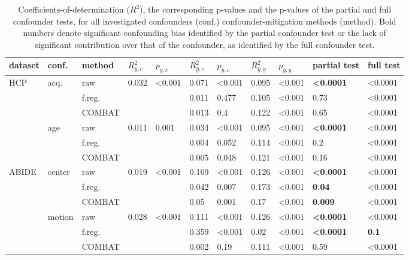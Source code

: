 \documentclass{article}
\begin{document}
\renewcommand{\arraystretch}{1.2}
\begin{table}
\centering
\begin{tabular}{lll|ll|ll|ll|ll} 
dataset & conf. & method & $R^2_{y, c}$ & $p_{y, c}$ & $R^2_{\hat{y}, c}$ & $p_{\hat{y}, c}$ & $R^2_{\hat{y}, y}$ & $p_{\hat{y}, y}$ & partial test & full test  \\
\hline
HCP & acq.  & raw      & 0.032 & <0.001 & 0.071 & <0.001  & 0.095 & <0.001 & \textbf{<0.0001} & <0.0001 \\
    &              & f.reg.    & & & 0.011 & 0.477 & 0.105  & <0.001  & 0.73 & <0.0001 \\
    &              & COMBAT    & & &0.013 & 0.4 & 0.122  & <0.001  & 0.65 & <0.0001\\
\hline
    & age   & raw       & 0.011 & 0.001  & 0.034 & <0.001  & 0.095  & <0.001 & \textbf{<0.0001} & <0.0001 \\
    &       & f.reg.    & & &0.004 & 0.052 & 0.114  & <0.001  & 0.2 & <0.0001 \\
    &       & COMBAT    & & &0.005 & 0.048 & 0.121 & <0.001 & 0.16 & <0.0001 \\
\hline
ABIDE   & center   & raw       & 0.019  & <0.001 &  0.169 & <0.001& 0.126     & <0.001 & \textbf{<0.0001} & <0.0001 \\
        &          & f.reg.    &  & &  0.042 & 0.007 & 0.173     & <0.001 & \textbf{0.04} & <0.0001 \\
        &          & COMBAT    &  & &  0.05 & 0.001 & 0.17     & <0.001 & \textbf{0.009} & <0.0001 \\
\hline
        & motion   & raw       & 0.028 & <0.001 & 0.111    &  <0.001 & 0.126    & <0.001 & \textbf{<0.0001} & <0.0001 \\
        &          & f.reg.    & & & 0.359    & <0.001  & 0.02   & <0.001 & \textbf{<0.0001} & \textbf{0.1} \\
        &          & COMBAT    & & &  0.002 & 0.19 & 0.111     & <0.001 & 0.59 & <0.0001 \\
    

\end{tabular}
\caption{\label{tab:unconditional-pvals} Coefficients-of-determination ($R^2$), the corresponding p-values and the p-values of the partial and full confounder tests, for all investigated confounders (conf.) confounder-mitigation methods (method). Bold numbers denote significant confounding bias identified by the partial confounder test or the lack of significant contribution over that of the confounder, as identified by the full confounder test.}
\end{table}
\end{document}
